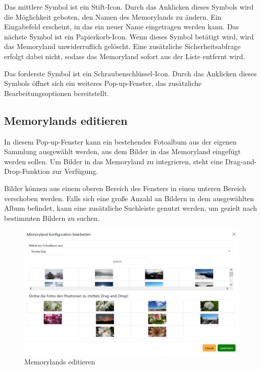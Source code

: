 Das mittlere Symbol ist ein Stift-Icon. Durch das Anklicken dieses Symbols wird 
die Möglichkeit geboten, den Namen des Memorylands zu ändern. Ein Eingabefeld 
erscheint, in das ein neuer Name eingetragen werden kann. Das nächste Symbol ist 
ein Papierkorb-Icon. Wenn dieses Symbol betätigt wird, wird das Memoryland 
unwiderruflich gelöscht. Eine zusätzliche Sicherheitsabfrage erfolgt dabei 
nicht, sodass das Memoryland sofort aus der Liste entfernt wird. 

Das forderste Symbol ist ein Schraubenschlüssel-Icon. Durch das Anklicken dieses 
Symbols öffnet sich ein weiteres Pop-up-Fenster, das zusätzliche Bearbeitungsoptionen 
bereitstellt. 

\subsection{Memorylands editieren}

In diesem Pop-up-Fenster kann ein bestehendes Fotoalbum aus der eigenen Sammlung 
ausgewählt werden, aus dem Bilder in das Memoryland eingefügt werden sollen. Um 
Bilder in das Memoryland zu integrieren, steht eine Drag-and-Drop-Funktion zur 
Verfügung. 

Bilder können aus einem oberen Bereich des Fensters in einen unteren 
Bereich verschoben werden. Falls sich eine gro\ss{}e Anzahl an Bildern in dem 
ausgewählten Album befindet, kann eine zusätzliche Suchleiste genutzt werden, 
um gezielt nach bestimmten Bildern zu suchen.

\begin{figure} [h t]
    \centering
    \includegraphics[scale=0.6]{pics/all_worlds_teil2_button.PNG}
    \caption{Memorylands editieren}
    \label{fig:all-worlds-memorylands-editieren}
\end{figure}

